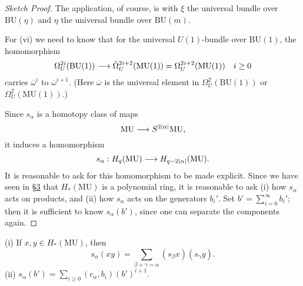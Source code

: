 \documentclass[../main]{subfiles}
\begin{document}
\begin{proof}[Sketch Proof]
The application, of course, is with $\xi$ the universal bundle over $\mathrm{BU}(\eta)$ and $\eta$ the universal bundle over $\mathrm{BU}(m)$.

For (vi) we need to know that for the universal $U(1)$-bundle over $\mathrm{BU}(1)$, the homomorphism $$\Omega_U^{2i}(\mathrm{BU}(1)) \overset{}{\longrightarrow} {\tilde \Omega}_U^{2 i + 2}(\mathrm{MU}(1)) = \Omega_U^{2i + 2}(\mathrm{MU}(1)) \quad i \ge 0$$ carries $\overline \omega^i$ to $\overline \omega^{i + 1}$. (Here $\overline \omega$ is the universal element in $\Omega_U^2(\mathrm{BU}(1))$ or $\Omega_U^2(\mathrm{MU}(1))$.)

Since $s_\alpha$ is a homotopy class of maps $$\mathrm{MU} \overset{}{\longrightarrow} S^{2|\alpha|} \mathrm{MU},$$ it induces a homomorphism $$s_\alpha : H_q(\mathrm{MU}) \overset{}{\longrightarrow} H_{q - 2|\alpha|} (\mathrm {MU}).$$ It is reasonable to ask for this homomorphism to be made explicit. Since we have seen in \hyperref[sec:p1c3]{\S 3} that $H_\ast(\mathrm{MU})$ is a polynomial ring, it is reasonable to ask (i) how $s_\alpha$ acts on products, and (ii) how $s_\alpha$ acts on the generators $b_i'$. Set $\displaystyle b' = \sum_{i = 0}^\infty b_i'$; then it is sufficient to know $s_\alpha(b')$, since one can separate the components again.
\end{proof}

\begin{theorem}\label{thm:p1c05.2}
(i) If $x ,y \in H_\ast(\mathrm{MU})$, then $$s_\alpha (xy) = \sum_{\beta + \gamma = \alpha} (s_\beta x) (s_\gamma y).$$ 
(ii) $\displaystyle s_\alpha(b') = \sum_{i \ge 0} (c_\alpha, b_i)(b')^{i + 1}.$
\end{theorem}
\end{document}
